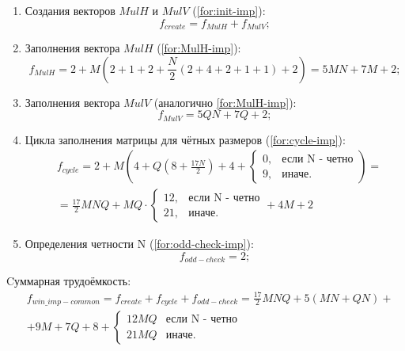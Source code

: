 \begin{enumerate}
	\item Создания векторов $MulH$ и $MulV$ (\ref{for:init-imp}):
	\begin{equation}
	\label{for:init-imp}
	f_{create} = f_{MulH} + f_{MulV};
	\end{equation}
	
	\item Заполнения вектора $MulH$ (\ref{for:MulH-imp}):
	\begin{equation}
	\label{for:MulH-imp}
	f_{MulH}=2+M(2+1+2+\frac{N}{2}(2+4+2+1+1)+2)=5MN+7M+2;
	\end{equation}
	
	\item Заполнения вектора $MulV$ (аналогично \ref{for:MulH-imp}):
	\begin{equation}
	\label{for:MulV-imp}
	f_{MulV}=5QN+7Q+2;
	\end{equation}
	
	\item Цикла заполнения матрицы для чётных размеров (\ref{for:cycle-imp}):
	\begin{equation}
	\label{for:cycle-imp}
	\begin{split}
		&f_{cycle}=2+M(4+Q(8+\frac{17N}{2})+4+
		\begin{cases}
			0, & \text{если N - четно}\\
			9, & \text{иначе.}
		\end{cases})=\\
		&=\frac{17}{2}MNQ+MQ\cdot
		\begin{cases}
			12, & \text{если N - четно}\\
			21, & \text{иначе.}
		\end{cases}+4M+2
	\end{split}
	\end{equation}

	\item Определения четности N (\ref{for:odd-check-imp}):
	\begin{equation}
	\label{for:odd-check-imp}
	f_{odd-check} = 2;
	\end{equation}
\end{enumerate}

Cуммарная трудоёмкость:
\begin{equation}
	\label{for:common-imp}
	\begin{split}
		&f_{win\_imp-common}=f_{create}+f_{cycle}+f_{odd-check}=\frac{17}{2}MNQ+5(MN+QN)+\\
		&+9M+7Q+8+\begin{cases}12MQ & \text{если N - четно}\\21MQ & \text{иначе.}\end{cases}
	\end{split}
\end{equation}



